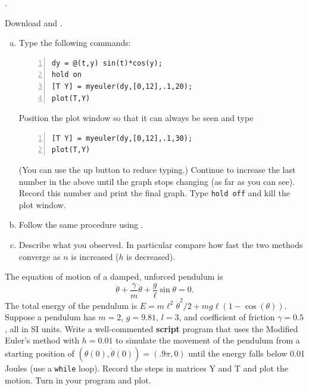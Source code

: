 \begin{list}
{.}{}

\item
Download  and  .
\begin{enumerate}[(a)]
\item 
Type the following commands:
\begin{lstlisting}[frame=none,numbers=left]
dy = @(t,y) sin(t)*cos(y);
hold on
[T Y] = myeuler(dy,[0,12],.1,20);
plot(T,Y)
\end{lstlisting}
Position the plot window so that it can always be seen and type
\begin{lstlisting}[frame=none,numbers=left]
[T Y] = myeuler(dy,[0,12],.1,30);
plot(T,Y)
\end{lstlisting}
(You can use the up button to reduce typing.)
Continue to increase the last number in the above until the graph
stops changing (as far as you can see). Record this number and print
the final graph. Type \verb&hold off& and kill the plot window.
\item Follow the same procedure using  .
\item
Describe what you observed. In particular compare how fast the two
methods converge as $n$ is increased ($h$ is decreased).
\end{enumerate}

\item The equation of motion of a damped, unforced pendulum is
$$   
     \ddot{\theta} + \frac{\gamma}{m} \dot{\theta} + \frac{g}{\ell} \sin \theta = 0.
$$
The total energy of the pendulum is $E = m \ell^2 \dot{\theta}^2/2 + m g \ell (1-\cos(\theta))$.
Suppose a pendulum has $m = 2$, $g = 9.81$, $l = 3$, and coefficient of friction $\gamma = 0.5$, all in SI units.
Write a well-commented {\bf script} program that uses the Modified Euler's method with $h = 0.01$ to simulate the movement of the pendulum from a starting position of
$(\theta(0),\dot{\theta}(0)) = (.9 \pi, 0)$ until the energy falls below 0.01 Joules (use a \verb&while& loop).  
Record the steps in matrices Y and T and plot the motion. Turn in your program and plot.
\end{list}



